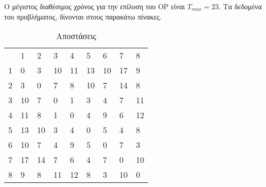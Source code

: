 \documentclass[12pt, a4paper]{article}
\begin{document}
Ο μέγιστος διαθέσιμος χρόνος για την επίλυση του OP είναι \(T_{max} = 23\). Τα δεδομένα του προβλήματος, δίνονται στους παρακάτω πίνακες. 

\begin{table}[H]
\centering
\begin{tabular}{lllllllll}
                       & 1                       & 2                       & 3                       & 4                       & 5                       & 6                       & 7                       & 8                       \\ \cline{2-9} 
\multicolumn{1}{l|}{1} & \multicolumn{1}{l|}{0}  & \multicolumn{1}{l|}{3}  & \multicolumn{1}{l|}{10} & \multicolumn{1}{l|}{11} & \multicolumn{1}{l|}{13} & \multicolumn{1}{l|}{10} & \multicolumn{1}{l|}{17} & \multicolumn{1}{l|}{9}  \\ \cline{2-9} 
\multicolumn{1}{l|}{2} & \multicolumn{1}{l|}{3}  & \multicolumn{1}{l|}{0}  & \multicolumn{1}{l|}{7}  & \multicolumn{1}{l|}{8}  & \multicolumn{1}{l|}{10} & \multicolumn{1}{l|}{7}  & \multicolumn{1}{l|}{14} & \multicolumn{1}{l|}{8}  \\ \cline{2-9} 
\multicolumn{1}{l|}{3} & \multicolumn{1}{l|}{10} & \multicolumn{1}{l|}{7}  & \multicolumn{1}{l|}{0}  & \multicolumn{1}{l|}{1}  & \multicolumn{1}{l|}{3}  & \multicolumn{1}{l|}{4}  & \multicolumn{1}{l|}{7}  & \multicolumn{1}{l|}{11} \\ \cline{2-9} 
\multicolumn{1}{l|}{4} & \multicolumn{1}{l|}{11} & \multicolumn{1}{l|}{8}  & \multicolumn{1}{l|}{1}  & \multicolumn{1}{l|}{0}  & \multicolumn{1}{l|}{4}  & \multicolumn{1}{l|}{9}  & \multicolumn{1}{l|}{6}  & \multicolumn{1}{l|}{12} \\ \cline{2-9} 
\multicolumn{1}{l|}{5} & \multicolumn{1}{l|}{13} & \multicolumn{1}{l|}{10} & \multicolumn{1}{l|}{3}  & \multicolumn{1}{l|}{4}  & \multicolumn{1}{l|}{0}  & \multicolumn{1}{l|}{5}  & \multicolumn{1}{l|}{4}  & \multicolumn{1}{l|}{8}  \\ \cline{2-9} 
\multicolumn{1}{l|}{6} & \multicolumn{1}{l|}{10} & \multicolumn{1}{l|}{7}  & \multicolumn{1}{l|}{4}  & \multicolumn{1}{l|}{9}  & \multicolumn{1}{l|}{5}  & \multicolumn{1}{l|}{0}  & \multicolumn{1}{l|}{7}  & \multicolumn{1}{l|}{3}  \\ \cline{2-9} 
\multicolumn{1}{l|}{7} & \multicolumn{1}{l|}{17} & \multicolumn{1}{l|}{14} & \multicolumn{1}{l|}{7}  & \multicolumn{1}{l|}{6}  & \multicolumn{1}{l|}{4}  & \multicolumn{1}{l|}{7}  & \multicolumn{1}{l|}{0}  & \multicolumn{1}{l|}{10} \\ \cline{2-9} 
\multicolumn{1}{l|}{8} & \multicolumn{1}{l|}{9}  & \multicolumn{1}{l|}{8}  & \multicolumn{1}{l|}{11} & \multicolumn{1}{l|}{12} & \multicolumn{1}{l|}{8}  & \multicolumn{1}{l|}{3}  & \multicolumn{1}{l|}{10} & \multicolumn{1}{l|}{0}  \\ \cline{2-9} 
\end{tabular}
\caption{Αποστάσεις}
\label{my-label}
\end{table}
\end{document}
